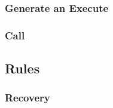 \documentclass[a4paper,12pt,english,oneside]{book}
\begin{document}
\subsubsection{Generate an Execute}

\subsubsection{Call}

\subsection{Rules}

\subsubsection{Recovery}\label{subsec:rec-fea}
\end{document}
